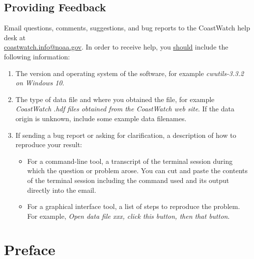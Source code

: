 \section*{Providing Feedback}

Email questions, comments, suggestions, and bug reports to the
CoastWatch help desk at \\
\href{mailto:coastwatch.info@noaa.gov}{coastwatch.info@noaa.gov}.
In order to receive help, you \underline{should} include the
following information:
\begin{enumerate}

  \item The version and operating system of the software, for
  example {\em cwutils-3.3.2 on Windows 10}.

  \item The type of data file and where you obtained the file,
  for example {\em CoastWatch .hdf files obtained from the CoastWatch web
  site}.  If the data origin is unknown, include some example data
  filenames.

  \item If sending a bug report or asking for clarification, a
  description of how to reproduce your result:
  \begin{itemize}

    \item For a command-line tool, a transcript of the terminal
    session during which the question or problem arose.  You
    can cut and paste the contents
    of the terminal session including the command used and its output
    directly into the email.

    \item For a graphical interface tool, a list of steps to
    reproduce the problem.  For example, {\em
    Open data file xxx, click this button, then that button}.

  \end{itemize}

\end{enumerate}

\newpage

\tableofcontents
\newpage

\listoffigures
\newpage

\setcounter{page}{1}

\chapter*{Preface}

